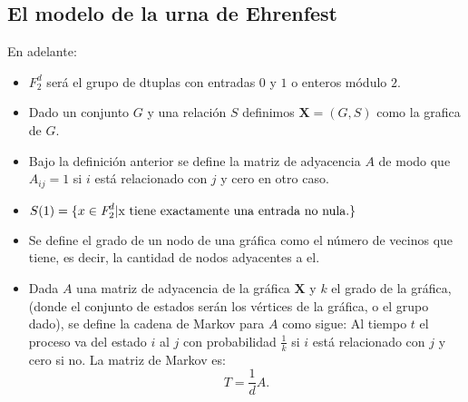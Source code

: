 \documentclass[a4paper,openright,10pt]{article}
\begin{document}
\subsection{El modelo de la urna de Ehrenfest}
En adelante:
\begin{itemize}
\item $\textit{F}_{2} ^{d}$ ser\'a el grupo de dtuplas con entradas $0$ y $1$ o enteros m\'odulo $2$.
\item Dado un conjunto $G$ y una relaci\'on $S$ definimos $\mathbf{X}=(G, S)$ como la grafica de $G.$
\item Bajo la definici\'on anterior se define la matriz de adyacencia $A$ de modo que $A_{ij}=1$ si $i$ est\'a relacionado con $j$ y cero en otro caso.
\item $S(1)=\{x\in \textit{F}_{2} ^{d} | \textnormal{x tiene exactamente una entrada no nula}.\}$
\item Se define el grado de un nodo de una gr\'afica como el n\'umero de vecinos que tiene, es decir, la cantidad de nodos adyacentes a el. 
\item Dada $A$ una matriz de adyacencia de la gr\'afica $\mathbf{X}$ y $k$ el grado de la gr\'afica, (donde el conjunto de estados ser\'an los v\'ertices de la gr\'afica, o el grupo dado), se define la cadena de Markov para $A$ como sigue: Al tiempo $t$ el proceso va del estado $i$ al $j$ con probabilidad $\frac{1}{k}$ si $i$ est\'a relacionado con $j$ y cero si no. La matriz de Markov es:
$$
T=\frac{1}{d}A.
$$
\end{itemize}
\end{document}
